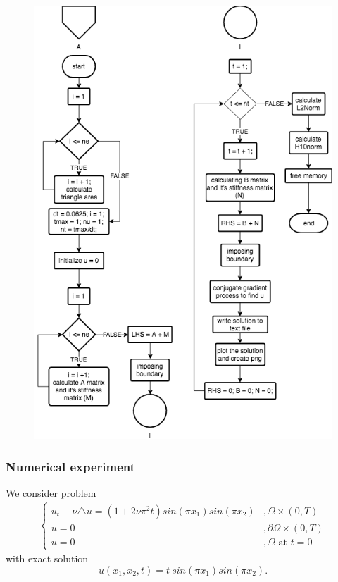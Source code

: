 \documentclass[a4paper,10pt]{article}
\begin{document}
\begin{figure}[h!]
	\centering
	\includegraphics[width=0.9\linewidth]{picture/heatEquationFlowchart2}
	\caption{}
	\label{fig:heatequationflowchart2}
\end{figure}

\newpage
\subsubsection{Numerical experiment}
We consider problem
\begin{eqnarray} \nonumber
\begin{cases}
u_{t} - \nu \triangle u = (1+2\nu\pi^{2}t)sin(\pi x_{1})sin(\pi x_{2}) &, \Omega \times (0,T)\\
u = 0 &, \partial \Omega \times (0,T)\\
u = 0 &, \Omega \text{ at } t=0
\end{cases}
\end{eqnarray}
with exact solution
\[ u(x_{1},x_{2},t) = t \ sin(\pi x_{1}) sin(\pi x_{2}). \]
\end{document}
